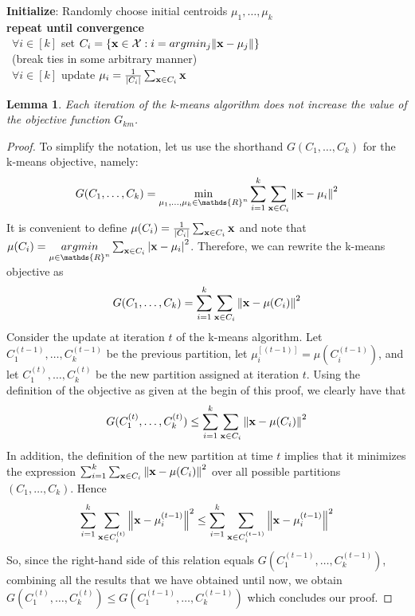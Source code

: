 \documentclass[12pt]{report}
\theoremstyle{plain}
\newtheorem{lemma}{Lemma}[chapter]
\newcommand\mcl[1]{\mathcal{#1}}
\begin{document}
\begin{flushleft}
\begin{tcolorbox}
	\textbf{Initialize}: Randomly choose initial centroids $\mu_1,\dots,\mu_k$\\
	
	\textbf{repeat until convergence}\\
	\-\ $\forall i\in[k]$ set $C_i=\left\{\vb{x}\in\mcl{X}:i=argmin_j\norm{\vb{x}-\mu_j} \right\}$\\
	\-\ (break ties in some arbitrary manner)\\
	\-\ $\forall i\in[k]$ update $\mu_i=\frac{1}{\abs{C_i}}\sum_{\vb{x}\in C_i}\vb{x}$\\
	
	\label{box:clus_km}
\end{tcolorbox}
\begin{lemma}
	Each iteration of the k-means algorithm does not increase the value of the objective function $G_{km}$.
\end{lemma}
\begin{proof}
	To simplify the notation, let us use the shorthand $G(C_1,\dots,C_k)$ for the k-means objective, namely:
	\[ G(C_1,\dots,C_k)=\min_{\mu_1,\dots,\mu_k\in\mathds{R}^n}\sum_{i=1}^k\sum_{\vb{x}\in C_i}\norm{\vb{x}-\mu_i}^2 \]
	It is convenient to define $\mu(C_i)=\frac{1}{\abs{C_i}}\sum_{\vb{x}\in C_i}\vb{x}$ and note that $\mu(C_i)=\underset{\mu\in\mathds{R}^n}{argmin}\sum_{\vb{x}\in C_i}\abs{\vb{x}-\mu_i}^2$. Therefore, we can rewrite the k-means objective as
	\[ G(C_1,\dots,C_k)=\sum_{i=1}^k\sum_{\vb{x}\in C_i}\norm{\vb{x}-\mu(C_i)}^2 \]
	Consider the update at iteration $t$ of the k-means algorithm. Let $C_1^{(t-1)},\dots,C_k^{(t-1)}$ be the previous partition, let $\mu_i^[(t-1)]=\mu(C_i^{(t-1)})$, and let $C_1^{(t)},\dots,C_k^{(t)}$ be the new partition assigned at iteration $t$. Using the definition of the objective as given at the begin of this proof, we clearly have that
	\[ G(C_1^{(t)},\dots,C_k^{(t)})\leq \sum_{i=1}^k\sum_{\vb{x}\in C_i}\norm{\vb{x}-\mu(C_i)}^2 \]
	In addition, the definition of the new partition at time $t$ implies that it minimizes the expression $\sum_{i=1}^k\sum_{\vb{x}\in C_i}\norm{\vb{x}-\mu(C_i)}^2$ over all possible partitions $(C_1,\dots,C_k)$. Hence
	\[ \sum_{i=1}^k\sum_{\vb{x}\in C_i^{(t)}}\norm{\vb{x}-\mu_i^{(t-1)}}^2\leq \sum_{i=1}^k\sum_{\vb{x}\in C_i^{(t-1)}}\norm{\vb{x}-\mu_i^{(t-1)}}^2 \]
	So, since the right-hand side of this relation equals $G(C_1^{(t-1)},\dots,C_k^{(t-1)})$, combining all the results that we have obtained until now, we obtain $G(C_1^{(t)},\dots,C_k^{(t)})\leq G(C_1^{(t-1)},\dots,C_k^{(t-1)})$ which concludes our proof.
\end{proof}

\end{flushleft}
\end{document}
